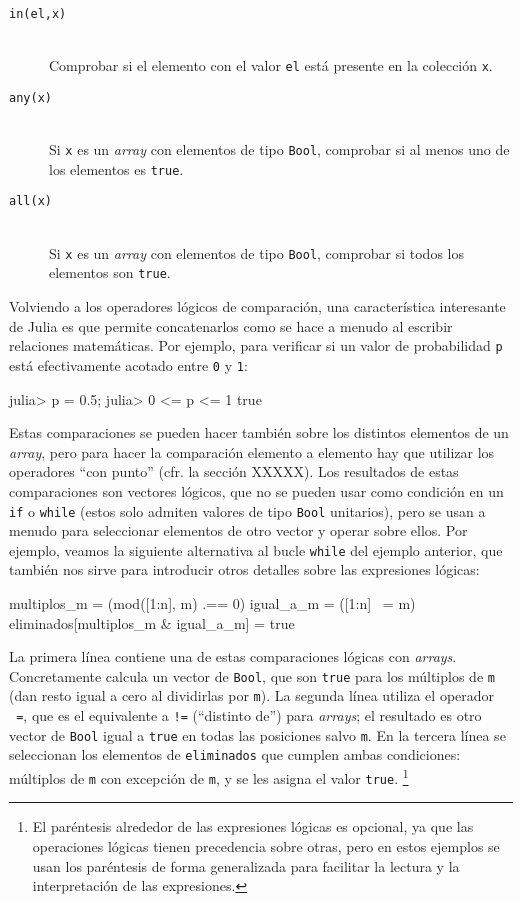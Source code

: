 ﻿\documentclass{article}
\newcommand{\jl}{\texttt}
\begin{document}
\begin{description}
  \item[\jl{in(el,x)}] \hfill \\
  Comprobar si el elemento con el valor \jl{el} está presente en la colección \jl{x}.
  \item[\jl{any(x)}] \hfill \\
  Si \jl{x} es un \emph{array} con elementos de tipo \jl{Bool}, comprobar si al menos uno de los elementos es \jl{true}.
  \item[\jl{all(x)}}] \hfill \\
  Si \jl{x} es un \emph{array} con elementos de tipo \jl{Bool}, comprobar si todos los elementos son \jl{true}.
\end{description}

Volviendo a los operadores lógicos de comparación, una característica interesante de Julia es que permite concatenarlos como se hace a menudo al escribir relaciones matemáticas. Por ejemplo, para verificar si un valor de probabilidad \jl{p} está efectivamente acotado entre \jl{0} y \jl{1}:

julia> p = 0.5;
julia> 0 <= p <= 1
true

Estas comparaciones se pueden hacer también sobre los distintos elementos de un \emph{array}, pero para hacer la comparación elemento a elemento hay que utilizar los operadores ``con punto'' (cfr. la sección XXXXX). Los resultados de estas comparaciones son vectores lógicos, que no se pueden usar como condición en un \jl{if} o \jl{while} (estos solo admiten valores de tipo \jl{Bool} unitarios), pero se usan a menudo para seleccionar elementos de otro vector y operar sobre ellos. Por ejemplo, veamos la siguiente alternativa al bucle \jl{while} del ejemplo anterior, que también nos sirve para introducir otros detalles sobre las expresiones lógicas:

multiplos_m = (mod([1:n], m) .== 0)
igual_a_m = ([1:n] ~= m)
eliminados[multiplos_m & igual_a_m] = true

La primera línea contiene una de estas comparaciones lógicas con \emph{arrays}. Concretamente calcula un vector de \jl{Bool}, que son \jl{true} para los múltiplos de \jl{m} (dan resto igual a cero al dividirlas por \jl{m}). La segunda línea utiliza el operador \jl{~=}, que es el equivalente a \jl{!=} (``distinto de'') para \emph{arrays}; el resultado es otro vector de \jl{Bool} igual a \jl{true} en todas las posiciones salvo \jl{m}. En la tercera línea se seleccionan los elementos de \jl{eliminados} que cumplen ambas condiciones: múltiplos de \jl{m} con excepción de \jl{m}, y se les asigna el valor \jl{true}.%
\footnote{%
El paréntesis alrededor de las expresiones lógicas es opcional, ya que las operaciones lógicas tienen precedencia sobre otras, pero en estos ejemplos se usan los paréntesis de forma generalizada para facilitar la lectura y la interpretación de las expresiones.%
}
\end{document}
